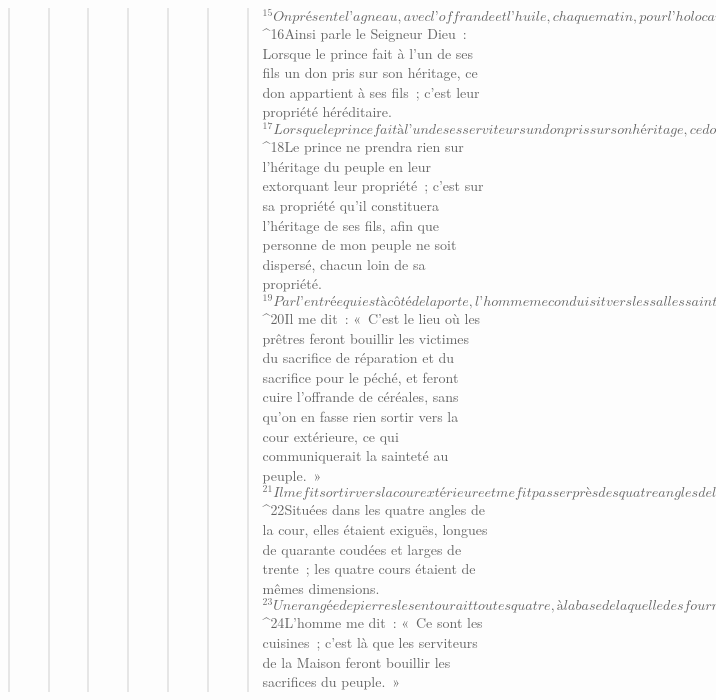 \begin{verse}
\begin{verse}
\begin{verse}
\begin{verse}
\begin{verse}
\begin{verse}
\begin{verse}
${}^{15}On présente l’agneau, avec l’offrande et l’huile, chaque matin, pour l’holocauste perpétuel.
${}^{16}Ainsi parle le Seigneur Dieu : Lorsque le prince fait à l’un de ses fils un don pris sur son héritage, ce don appartient à ses fils ; c’est leur propriété héréditaire. 
${}^{17}Lorsque le prince fait à l’un de ses serviteurs un don pris sur son héritage, ce don appartient au serviteur jusqu’à l’année de l’affranchissement ; après quoi il revient au prince. Seule la part de l’héritage donnée aux fils du prince reste en leur possession. 
${}^{18}Le prince ne prendra rien sur l’héritage du peuple en leur extorquant leur propriété ; c’est sur sa propriété qu’il constituera l’héritage de ses fils, afin que personne de mon peuple ne soit dispersé, chacun loin de sa propriété.
${}^{19}Par l’entrée qui est à côté de la porte, l’homme me conduisit vers les salles saintes, tournées vers le nord et destinées aux prêtres. Il y avait au fond un espace, vers l’ouest. 
${}^{20}Il me dit : « C’est le lieu où les prêtres feront bouillir les victimes du sacrifice de réparation et du sacrifice pour le péché, et feront cuire l’offrande de céréales, sans qu’on en fasse rien sortir vers la cour extérieure, ce qui communiquerait la sainteté au peuple. » 
${}^{21}Il me fit sortir vers la cour extérieure et me fit passer près des quatre angles de la cour : il y avait une cour à chaque angle. 
${}^{22}Situées dans les quatre angles de la cour, elles étaient exiguës, longues de quarante coudées et larges de trente ; les quatre cours étaient de mêmes dimensions. 
${}^{23}Une rangée de pierres les entourait toutes quatre, à la base de laquelle des fourneaux avaient été aménagés, tout autour. 
${}^{24}L’homme me dit : « Ce sont les cuisines ; c’est là que les serviteurs de la Maison feront bouillir les sacrifices du peuple. »
      

\end{verse}
\end{verse}
\end{verse}
\end{verse}
\end{verse}
\end{verse}
\end{verse}
